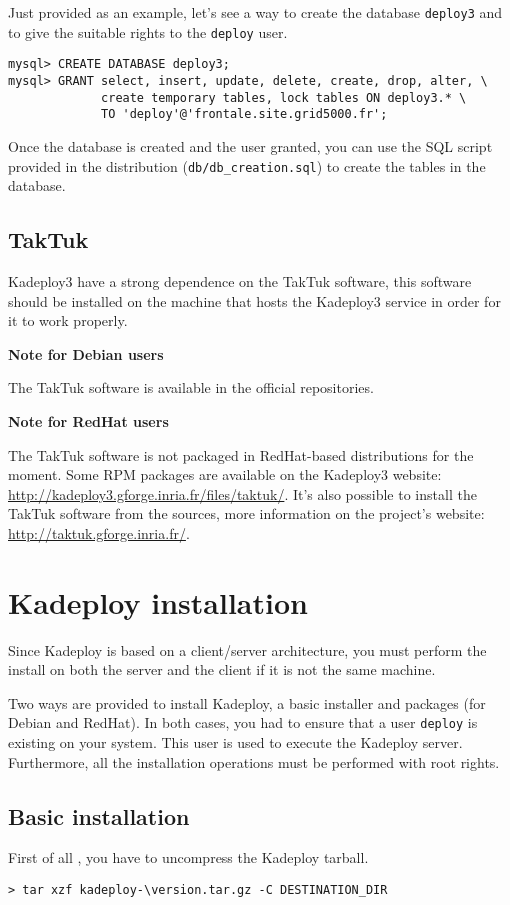 \documentclass[a4wide,10pt,oneside]{book}
\newcommand{\version}{3.1.7}
\begin{document}
Just provided as an example, let's see a way to create the database \texttt{deploy3} and to give the suitable rights to the \texttt{deploy} user.
\begin{verbatim}
mysql> CREATE DATABASE deploy3;
mysql> GRANT select, insert, update, delete, create, drop, alter, \
             create temporary tables, lock tables ON deploy3.* \
             TO 'deploy'@'frontale.site.grid5000.fr';
\end{verbatim}

Once the database is created and the user granted, you can use the SQL script provided in the distribution (\texttt{db/db\_creation.sql}) to create the tables in the database.

\subsection{TakTuk}
Kadeploy3 have a strong dependence on the TakTuk software, this software should be installed on the machine that hosts the Kadeploy3 service in order for it to work properly.

\noindent \textbf{Note for Debian users}

\noindent The TakTuk software is available in the official repositories.

\noindent \textbf{Note for RedHat users}

\noindent The TakTuk software is not packaged in RedHat-based distributions for the moment. Some RPM packages are available on the Kadeploy3 website: \url{http://kadeploy3.gforge.inria.fr/files/taktuk/}. It's also possible to install the TakTuk software from the sources, more information on the project's website: \url{http://taktuk.gforge.inria.fr/}.



\section{Kadeploy installation}
Since Kadeploy is based on a client/server architecture, you must perform the install on both the server and the client if it is not the same machine.

Two ways are provided to install Kadeploy, a basic installer and packages (for Debian and RedHat). In both cases, you had to ensure that a user \texttt{deploy} is existing on your system. This user is used to execute the Kadeploy server. Furthermore, all the installation operations must be performed with root rights.

\subsection{Basic installation}
First of all , you have to uncompress the Kadeploy tarball.
\begin{small}
\begin{Verbatim}[commandchars=\\\{\}]
> tar xzf kadeploy-\version.tar.gz -C DESTINATION_DIR
\end{Verbatim}
\end{small}
\end{document}
